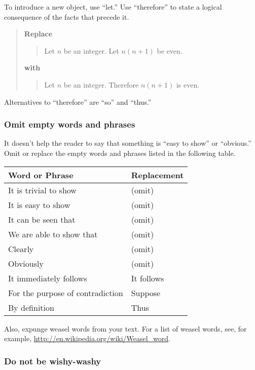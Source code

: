 \documentclass[12pt,fleqn]{article}
\newcounter{ex}\setcounter{ex}{0}
\newcounter{se}\setcounter{se}{0}
\begin{document}
To introduce a new object, use ``let.''  Use ``therefore'' to
state a logical consequence of the facts that precede it.


\begin{quote}
\textbf{\textbf{Replace}}
\begin{quote}
  Let \(n\) be an integer. Let \(n (n+1)\) be even.
\end{quote}
\textbf{with}
\begin{quote}
Let \(n\) be an integer.  Therefore \(n (n+1)\) is even.
\end{quote}
\end{quote}
Alternatives to ``therefore'' are ``so'' and ``thus.''


 \subsubsection{  Omit empty words and phrases} 

It doesn't help the reader to say that something is 
``easy to show'' or ``obvious.'' Omit or replace
the empty words and phrases listed in the following table.

\begin{center}
\begin{tabular}{| l l |}
\hline  \textbf {Word or Phrase} &  \textbf{Replacement} \\ 
\hline
It is trivial to show    & (omit) \\
It is easy to show     & (omit) \\   
It can be seen that    & (omit) \\
We are able to show that & (omit) \\
Clearly   & (omit) \\
Obviously  & (omit) \\
It immediately follows & It follows \\
For the purpose of contradiction &  Suppose \\
By definition                    & Thus \\
\hline
\end{tabular}
\end{center}
Also, expunge weasel words from your text. For a list of weasel words,  see, for example,  
\url{http://en.wikipedia.org/wiki/Weasel_word}.




 \subsubsection{  Do not be wishy-washy}  
\end{document}
